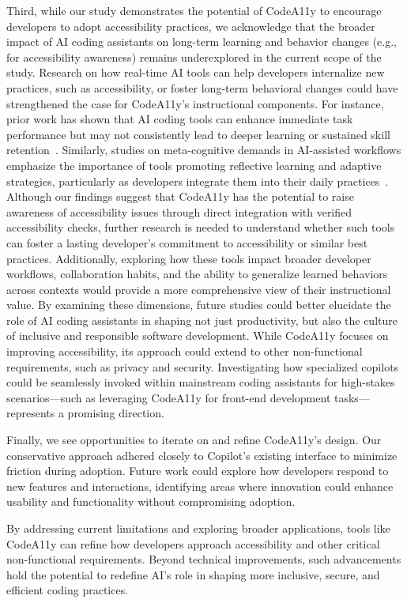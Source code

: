 \begin{highlight}
Third, while our study demonstrates the potential of CodeA11y to encourage developers to adopt accessibility practices, we acknowledge that the broader impact of AI coding assistants on long-term learning and behavior changes (e.g., for accessibility awareness) remains underexplored in the current scope of the study. Research on how real-time AI tools can help developers internalize new practices, such as accessibility, or foster long-term behavioral changes could have strengthened the case for CodeA11y’s instructional components. For instance, prior work has shown that AI coding tools can enhance immediate task performance but may not consistently lead to deeper learning or sustained skill retention~\cite{kazemitabaar2023studying}. Similarly, studies on meta-cognitive demands in AI-assisted workflows emphasize the importance of tools promoting reflective learning and adaptive strategies, particularly as developers integrate them into their daily practices~\cite{tankelevitch2024metacognitive}. Although our findings suggest that CodeA11y has the potential to raise awareness of accessibility issues through direct integration with verified accessibility checks, further research is needed to understand whether such tools can foster a lasting developer's commitment to accessibility or similar best practices. Additionally, exploring how these tools impact broader developer workflows, collaboration habits, and the ability to generalize learned behaviors across contexts would provide a more comprehensive view of their instructional value. By examining these dimensions, future studies could better elucidate the role of AI coding assistants in shaping not just productivity, but also the culture of inclusive and responsible software development. While CodeA11y focuses on improving accessibility, its approach could extend to other non-functional requirements, such as privacy and security. Investigating how specialized copilots could be seamlessly invoked within mainstream coding assistants for high-stakes scenarios---such as leveraging CodeA11y for front-end development tasks---represents a promising direction.
\end{highlight}

Finally, we see opportunities to iterate on and refine CodeA11y’s design. Our conservative approach adhered closely to Copilot’s existing interface to minimize friction during adoption. Future work could explore how developers respond to new features and interactions, identifying areas where innovation could enhance usability and functionality without compromising adoption.
\begin{highlight}
By addressing current limitations and exploring broader applications, tools like CodeA11y can refine how developers approach accessibility and other critical non-functional requirements. Beyond technical improvements, such advancements hold the potential to redefine AI’s role in shaping more inclusive, secure, and efficient coding practices. 
\end{highlight}

